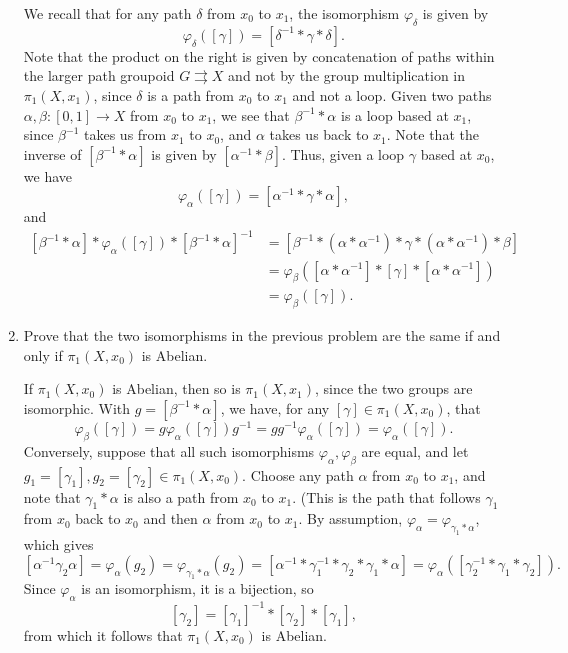 \documentclass[letterpaper,12pt]{article}
\newcommand{\cla}[1]{\left[ #1\right]}
\begin{document}
\begin{enumerate}
We recall that for any path $\delta$ from $x_0$ to $x_1$, the isomorphism $\varphi_\delta$ is given by
\[
 \varphi_\delta(\cla{\gamma}) = \cla{\delta^{-1}\ast\gamma\ast\delta}.
\]
Note that the product on the right is given by concatenation of paths within the larger path groupoid $G\rightrightarrows X$ and not by the group multiplication in $\pi_1(X,x_1)$, since $\delta$ is a path from $x_0$ to $x_1$ and not a loop. Given two paths $\alpha,\beta:[0,1]\to X$ from $x_0$ to $x_1$, we see that $\beta^{-1}\ast \alpha$ is a loop based at $x_1$, since $\beta^{-1}$ takes us from $x_1$ to $x_0$, and $\alpha$ takes us back to $x_1$. Note that the inverse of $\cla{\beta^{-1}\ast\alpha}$ is given by $\cla{\alpha^{-1}\ast\beta}$. Thus, given a loop $\gamma$ based at $x_0$, we have
\[
 \varphi_\alpha(\cla{\gamma}) = \cla{\alpha^{-1}\ast\gamma\ast\alpha},
\]
and
\begin{align*}
 \cla{\beta^{-1}\ast\alpha}\ast\varphi_\alpha(\cla{\gamma})\ast\cla{\beta^{-1}\ast\alpha}^{-1} & = \cla{\beta^{-1}\ast(\alpha\ast\alpha^{-1})\ast\gamma\ast(\alpha\ast\alpha^{-1})\ast\beta}\\
& = \varphi_{\beta}([\alpha\ast\alpha^{-1}]\ast\cla{\gamma}\ast[\alpha\ast\alpha^{-1}])\\
& = \varphi_\beta(\cla{\gamma}).
\end{align*}



\bigskip

\item Prove that the two isomorphisms in the previous problem are the same if and only if $\pi_1(X,x_0)$ is Abelian.

\bigskip

If $\pi_1(X,x_0)$ is Abelian, then so is $\pi_1(X,x_1)$, since the two groups are isomorphic. With $g=[\beta^{-1}\ast\alpha]$, we have, for any $[\gamma]\in \pi_1(X,x_0)$, that
\[
 \varphi_\beta(\cla{\gamma}) = g\varphi_{\alpha}([\gamma])g^{-1} = gg^{-1}\varphi_{\alpha}(\cla{\gamma}) = \varphi_\alpha(\cla{\gamma}).
\]
Conversely, suppose that all such isomorphisms $\varphi_\alpha,\varphi_\beta$ are equal, and let $g_1= \cla{\gamma_1},g_2=\cla{\gamma_2}\in \pi_1(X,x_0)$. Choose any path $\alpha$ from $x_0$ to $x_1$, and note that $\gamma_1\ast\alpha$ is also a path from $x_0$ to $x_1$. (This is the path that follows $\gamma_1$ from $x_0$ back to $x_0$ and then $\alpha$ from $x_0$ to $x_1$. By assumption, $\varphi_\alpha = \varphi_{\gamma_1\ast\alpha}$, which gives
\[
 \cla{\alpha^{-1}\gamma_2\alpha}=\varphi_\alpha(g_2)=\varphi_{\gamma_1\ast\alpha}(g_2) = \cla{\alpha^{-1}\ast\gamma_1^{-1}\ast\gamma_2\ast\gamma_1\ast\alpha} = \varphi_\alpha(\cla{\gamma_2^{-1}\ast\gamma_1\ast\gamma_2}).
\]
Since $\varphi_\alpha$ is an isomorphism, it is a bijection, so
\[
 \cla{\gamma_2} = \cla{\gamma_1}^{-1}\ast\cla{\gamma_2}\ast\cla{\gamma_1},
\]
from which it follows that $\pi_1(X,x_0)$ is Abelian.


\end{enumerate}
\end{document}
